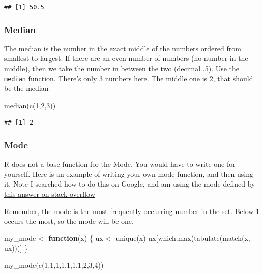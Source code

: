 \documentclass[
]{book}
\newenvironment{Shaded}{\begin{snugshade}}{\end{snugshade}}
\newcommand{\ControlFlowTok}[1]{\textcolor[rgb]{0.13,0.29,0.53}{\textbf{#1}}}
\newcommand{\DecValTok}[1]{\textcolor[rgb]{0.00,0.00,0.81}{#1}}
\newcommand{\FunctionTok}[1]{\textcolor[rgb]{0.00,0.00,0.00}{#1}}
\newcommand{\NormalTok}[1]{#1}
\newcommand{\OtherTok}[1]{\textcolor[rgb]{0.56,0.35,0.01}{#1}}
\begin{document}
\begin{verbatim}
## [1] 50.5
\end{verbatim}

\hypertarget{median}{%
\subsubsection{Median}\label{median}}

The median is the number in the exact middle of the numbers ordered from smallest to largest. If there are an even number of numbers (no number in the middle), then we take the number in between the two (decimal .5). Use the \texttt{median} function. There's only 3 numbers here. The middle one is 2, that should be the median

\begin{Shaded}
\begin{Highlighting}[]
\FunctionTok{median}\NormalTok{(}\FunctionTok{c}\NormalTok{(}\DecValTok{1}\NormalTok{,}\DecValTok{2}\NormalTok{,}\DecValTok{3}\NormalTok{))}
\end{Highlighting}
\end{Shaded}

\begin{verbatim}
## [1] 2
\end{verbatim}

\hypertarget{mode}{%
\subsubsection{Mode}\label{mode}}

R does not a base function for the Mode. You would have to write one for yourself. Here is an example of writing your own mode function, and then using it. Note I searched how to do this on Google, and am using the mode defined by \href{https://stackoverflow.com/questions/2547402/is-there-a-built-in-function-for-finding-the-mode}{this answer on stack overflow}

Remember, the mode is the most frequently occurring number in the set. Below 1 occurs the most, so the mode will be one.

\begin{Shaded}
\begin{Highlighting}[]
\NormalTok{my\_mode }\OtherTok{\textless{}{-}} \ControlFlowTok{function}\NormalTok{(x) \{}
\NormalTok{  ux }\OtherTok{\textless{}{-}} \FunctionTok{unique}\NormalTok{(x)}
\NormalTok{  ux[}\FunctionTok{which.max}\NormalTok{(}\FunctionTok{tabulate}\NormalTok{(}\FunctionTok{match}\NormalTok{(x, ux)))]}
\NormalTok{\}}

\FunctionTok{my\_mode}\NormalTok{(}\FunctionTok{c}\NormalTok{(}\DecValTok{1}\NormalTok{,}\DecValTok{1}\NormalTok{,}\DecValTok{1}\NormalTok{,}\DecValTok{1}\NormalTok{,}\DecValTok{1}\NormalTok{,}\DecValTok{1}\NormalTok{,}\DecValTok{1}\NormalTok{,}\DecValTok{2}\NormalTok{,}\DecValTok{3}\NormalTok{,}\DecValTok{4}\NormalTok{))}
\end{Highlighting}
\end{Shaded}
\end{document}
